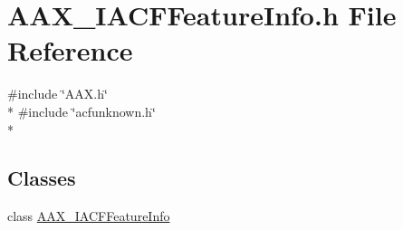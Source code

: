 \hypertarget{a00225}{}\section{A\+A\+X\+\_\+\+I\+A\+C\+F\+Feature\+Info.\+h File Reference}
\label{a00225}
{\ttfamily \#include \char`\"{}A\+A\+X.\+h\char`\"{}}\\*
{\ttfamily \#include \char`\"{}acfunknown.\+h\char`\"{}}\\*
\subsection*{Classes}
\begin{DoxyCompactItemize}
\item 
class \hyperlink{a00065}{A\+A\+X\+\_\+\+I\+A\+C\+F\+Feature\+Info}
\end{DoxyCompactItemize}
